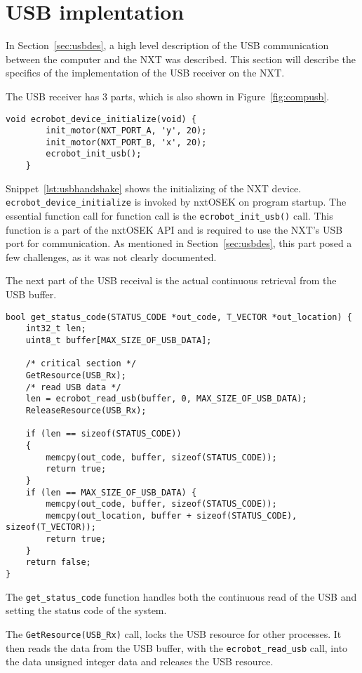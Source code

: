 \section{USB implentation}
\label{sec:usbimp}
In Section~\ref{sec:usbdes}, a high level description of the USB communication between the computer and the NXT was described.
This section will describe the specifics of the implementation of the USB receiver on the NXT.

The USB receiver has 3 parts, which is also shown in Figure~\ref{fig:compusb}.

\begin{lstlisting}[language=CSharp,label={lst:usbhandshake},caption={ecrobot\_device\_initialize method from nxt.c}]
    void ecrobot_device_initialize(void) {
        init_motor(NXT_PORT_A, 'y', 20);
        init_motor(NXT_PORT_B, 'x', 20);
        ecrobot_init_usb();
    }
\end{lstlisting}
Snippet~\ref{lst:usbhandshake} shows the initializing of the NXT device.
\texttt{ecrobot\_device\_initialize} is invoked by nxtOSEK on program startup.
The essential function call for function call is the \texttt{ecrobot\_init\_usb()} call.
This function is a part of the nxtOSEK API and is required to use the NXT's USB port for communication.
As mentioned in Section~\ref{sec:usbdes}, this part posed a few challenges, as it was not clearly documented.

The next part of the USB receival is the actual continuous retrieval from the USB buffer.
\begin{lstlisting}[language=CSharp,label={lst:usbreceive},caption={get\_status\_code method from usb.c}]
bool get_status_code(STATUS_CODE *out_code, T_VECTOR *out_location) {
	int32_t len;
	uint8_t buffer[MAX_SIZE_OF_USB_DATA];

	/* critical section */
	GetResource(USB_Rx);
	/* read USB data */
	len = ecrobot_read_usb(buffer, 0, MAX_SIZE_OF_USB_DATA);
	ReleaseResource(USB_Rx);

	if (len == sizeof(STATUS_CODE))
	{
		memcpy(out_code, buffer, sizeof(STATUS_CODE));
		return true;
	}
	if (len == MAX_SIZE_OF_USB_DATA) {
		memcpy(out_code, buffer, sizeof(STATUS_CODE));
		memcpy(out_location, buffer + sizeof(STATUS_CODE), sizeof(T_VECTOR));
		return true;
	}
	return false;
}
\end{lstlisting}
The \texttt{get\_status\_code} function handles both the continuous read of the USB and setting the status code of the system.

The \texttt{GetResource(USB\_Rx)} call, locks the USB resource for other processes.
It then reads the data from the USB buffer, with the \texttt{ecrobot\_read\_usb} call, into the data unsigned integer data and releases the USB resource.


